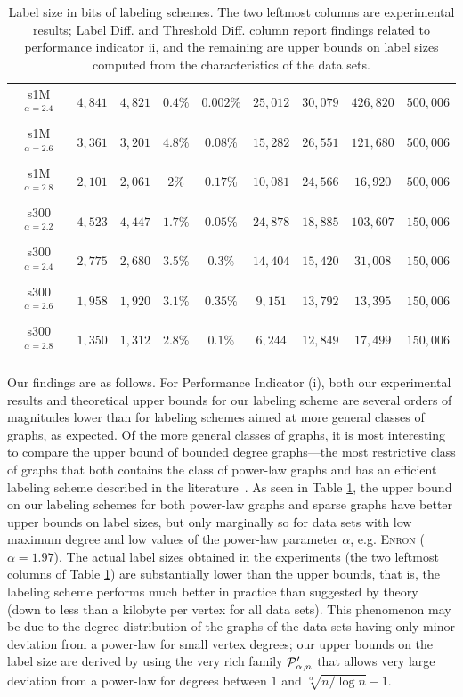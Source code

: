 \begin{table}
\begin{tabular}{ccccccccc}
s1M$^{\alpha=2.4}$  &$4,841$    &$4,821$  & $0.4\%$ & $0.002\%$  & $25,012 $ &$30,079$     &$426,820$ &$500,006$\\
s1M$^{\alpha=2.6}$  &$3,361$    &$3,201$   & $4.8\%$ & $0.08\%$  & $15,282 $ &$26,551$     &$121,680$ &$500,006$\\
s1M$^{\alpha=2.8}$  &$2,101$    &$2,061$    & $2\%$ & $0.17\%$  & $10,081 $ &$24,566$     &$16,920$  &$500,006$\\
s300$^{\alpha=2.2}$ &$4,523$    &$4,447$  & $1.7\%$ & $0.05\%$  & $24,878 $ &$18,885$     &$103,607$ &$150,006$\\
s300$^{\alpha=2.4}$ &$2,775$    &$2,680$   & $3.5\%$  & $0.3\%$ & $14,404 $ &$15,420$     &$31,008$  &$150,006$\\
s300$^{\alpha=2.6}$ &$1,958$    &$1,920$  & $3.1\%$ & $0.35\%$   & $9,151 $  &$13,792$     &$13,395$  &$150,006$\\
s300$^{\alpha=2.8}$ &$1,350$    &$1,312$  & $2.8\%$ & $0.1\%$   & $6,244 $  &$12,849$     &$17,499$  &$150,006$\\\hline
\end{tabular}
\caption{Label size in bits of labeling schemes. The two leftmost columns are experimental results; Label Diff. and  Threshold Diff. column  report findings related to  performance indicator ii, and the remaining are upper bounds on label sizes computed from the characteristics of the data sets.}
\label{t:labelsizes}
\end{table}

Our findings are as follows.
For Performance Indicator (i), both our experimental results and theoretical upper bounds for our labeling scheme are several orders of magnitudes lower than for labeling schemes aimed at more general classes of graphs, as expected. Of the more general classes of graphs, it is most interesting to compare the upper bound of bounded degree graphs---the most restrictive class of graphs that both contains the class of power-law graphs and has an efficient labeling scheme described in the literature~\cite{adjiashvili2014labeling}. As seen in Table \ref{t:labelsizes}, the upper bound on our labeling schemes for both power-law graphs and sparse graphs have better upper bounds on label sizes, but only marginally so for data sets with low maximum degree and low values of the power-law parameter $\alpha$, e.g. \textsc{Enron} ($\alpha = 1.97$). 
The actual label sizes obtained in the experiments (the two leftmost columns of Table \ref{t:labelsizes}) are substantially lower than the upper bounds, that is, the labeling scheme performs much better in practice than suggested by theory (down to less than a kilobyte per vertex for all data sets). 
This phenomenon may be due to the degree distribution of the graphs of the data sets having only minor deviation from a power-law for small vertex degrees; our upper bounds on the label size are derived by using the very rich family $ \mathcal{P}'_{\alpha,n}$ that allows very large deviation from a power-law for degrees between $1$ and $\sqrt[\alpha]{n/\log n} - 1$.

